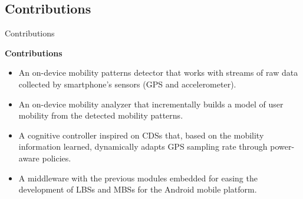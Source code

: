 \subsection{Contributions}
\begin{frame}{Contributions}
\small
\begin{block}{\small \textbf{Contributions}}
\begin{itemize}
  \item An on-device mobility patterns detector that works with streams of raw data collected by smartphone's sensors (GPS and accelerometer).
  \item An on-device mobility analyzer that incrementally builds a model of user mobility from the detected mobility patterns.
  \item A cognitive controller inspired on CDSs that, based on the mobility information learned, dynamically adapts GPS sampling rate through power-aware policies. 
  \item A middleware with the previous modules embedded for easing the development of LBSs and MBSs for the Android mobile platform.
\end{itemize}
\end{block}
\end{frame}
